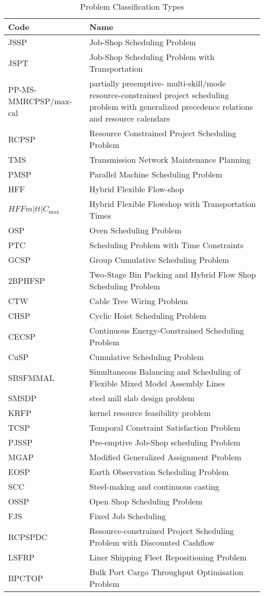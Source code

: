 \documentclass[a4paper]{article}
\begin{document}
\begin{table}[htbp]
\caption{\label{tab:classification}Problem Classification Types}
\centering
{\scriptsize
\begin{tabular}{lp{8cm}}\toprule
Code & Name \\ \midrule
JSSP & Job-Shop Scheduling Problem \\
JSPT & Job-Shop Scheduling Problem with Transportation \\
PP-MS-MMRCPSP/max-cal & partially preemptive- multi-skill/mode resource-constrained project scheduling problem with generalized precedence relations and resource calendars\\
RCPSP & Resource Constrained Project Scheduling Problem \\
TMS & Transmission Network Maintenance Planning \\
PMSP & Parallel Machine Scheduling Problem\\
HFF & Hybrid Flexible Flow-shop \\
$HFFm|tt|C_{\max}$ & Hybrid Flexible Flowshop with Transportation Times\\
OSP & Oven Scheduling Problem \\
PTC & Scheduling Problem with Time Constraints\\
GCSP & Group Cumulative Scheduling Problem \\
2BPHFSP & Two-Stage Bin Packing and Hybrid Flow Shop Scheduling Problem\\
CTW & Cable Tree Wiring Problem\\
CHSP & Cyclic Hoist Scheduling Problem \\
CECSP & Continuous Energy-Constrained Scheduling Problem \\
CuSP & Cumulative Scheduling Problem \\
SBSFMMAL & Simultaneous Balancing and Scheduling of Flexible Mixed Model Assembly Lines\\
SMSDP & steel mill slab design problem \\
KRFP & kernel resource feasibility problem\\
TCSP & Temporal Constraint Satisfaction Problem\\
PJSSP & Pre-emptive Job-Shop scheduling Problem\\
MGAP & Modified Generalized Assignment Problem\\
EOSP & Earth Observation Scheduling Problem \\
SCC & Steel-making and continuous casting \\
OSSP & Open Shop Scheduling Problem\\
FJS & Fixed Job Scheduling\\
RCPSPDC & Resource-constrained Project Scheduling Problem with Discounted Cashflow \\
LSFRP & Liner Shipping Fleet Repositioning Problem\\
BPCTOP & Bulk Port Cargo Throughput Optimisation Problem\\

\bottomrule
\end{tabular}
}
\end{table}
\end{document}
